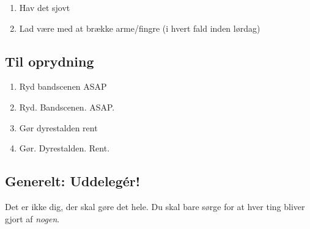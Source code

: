 \begin{enumerate}
\item Hav det sjovt

\item Lad være med at brække arme/fingre (i hvert fald inden lørdag)
\end{enumerate}

\subsection*{Til oprydning}

\begin{enumerate}
\item Ryd bandscenen ASAP

\item Ryd. Bandscenen. ASAP.

\item Gør dyrestalden rent

\item Gør. Dyrestalden. Rent.

\end{enumerate}

\subsection*{Generelt: Uddelegér!}
Det er ikke dig, der skal gøre det hele.
Du skal bare sørge for at hver ting bliver gjort af \textit{nogen}.